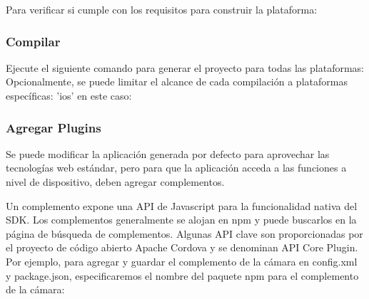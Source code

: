 Para verificar si cumple con los requisitos para construir la plataforma:


\subsubsection{Compilar}
Ejecute el siguiente comando para generar el proyecto para todas las plataformas:
Opcionalmente, se puede limitar el alcance de cada compilación a plataformas específicas: 'ios' en este caso:


\subsubsection{Agregar Plugins}
Se puede modificar la aplicación generada por defecto para aprovechar las tecnologías web estándar, pero para que la aplicación acceda a las funciones a nivel de dispositivo, deben agregar complementos.

Un complemento expone una API de Javascript para la funcionalidad nativa del SDK. Los complementos generalmente se alojan en npm y puede buscarlos en la página de búsqueda de complementos. Algunas API clave son proporcionadas por el proyecto de código abierto Apache Cordova y se denominan API Core Plugin. Por ejemplo, para agregar y guardar el complemento de la cámara en config.xml y package.json, especificaremos el nombre del paquete npm para el complemento de la cámara:


